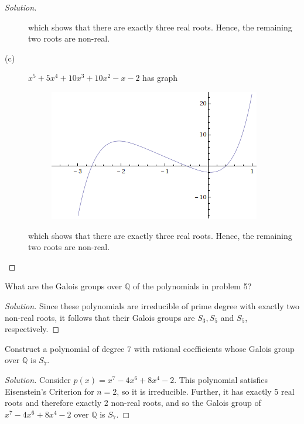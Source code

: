 \documentclass[12pt,leqno]{article}
\numberwithin{equation}{section}
\newcommand{\question}[2] {\vspace{.25in} \noindent\fbox{#1} #2 \vspace{.10in}}
\theoremstyle{definition}
\begin{document}
\begin{proof}[Solution]
\begin{description}
which shows that there are exactly three real roots. Hence, the remaining two roots are non-real.
  \item [(c)] $x^5+5x^4+10x^3+10x^2-x-2$ has graph 
\begin{figure}[h]
\centering\includegraphics[scale=.5]{5-5-c.png}                                                                                                                                                                                                                                                                                                                                                               \end{figure} 

which shows that there are exactly three real roots. Hence, the remaining two roots are non-real.
 \end{description}

\end{proof}

\question{6}{What are the Galois groups over $\mathbb{Q}$ of the polynomials in problem 5?}

\begin{proof}[Solution]
 Since these polynomials are irreducible of prime degree with exactly two non-real roots, it follows that their Galois groups are $S_3,S_5$ and $S_5$, respectively.
\end{proof}

\question{7}{Construct a polynomial of degree 7 with rational coefficients whose Galois group over $\mathbb{Q}$ is $S_7$.}

\begin{proof}[Solution]
 Consider $p(x)=x^7-4x^6+8x^4-2$. This polynomial satisfies Eisenstein's Criterion for $n=2$, so it is irreducible. Further, it has exactly 5 real roots and therefore exactly 2 non-real roots, and so the Galois group of $x^7-4x^6+8x^4-2$ over $\mathbb{Q}$ is $S_7$. 
\end{proof}
\end{document}
